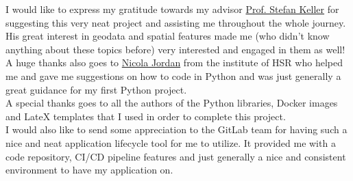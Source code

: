 I would like to express my gratitude towards my advisor \href{mailto:stefan.keller@hsr.ch}{Prof. Stefan Keller} for suggesting this very neat project and assisting me throughout the whole journey. His great interest in geodata and spatial features made me (who didn't know anything about these topics before) very interested and engaged in them as well!\\
A huge thanks also goes to \href{mailto:nicola.jordan@hsr.ch}{Nicola Jordan} from the institute of HSR who helped me and gave me suggestions on how to code in Python and was just generally a great guidance for my first Python project.\\
A special thanks goes to all the authors of the Python libraries, Docker images and LateX templates that I used in order to complete this project.\\
I would also like to send some appreciation to the GitLab team for having such a nice and neat application lifecycle tool for me to utilize. It provided me with a code repository, CI/CD pipeline features and just generally a nice and consistent environment to have my application on.